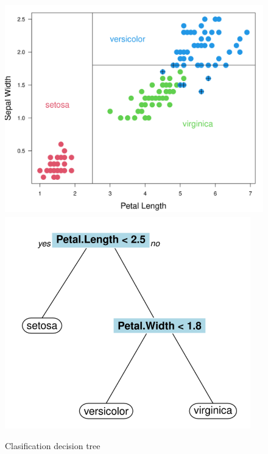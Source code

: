 \documentclass[
]{book}
\begin{document}
\begin{figure}

{\centering \includegraphics[width=0.45\linewidth,height=260pt]{./imgs/tree1} \includegraphics[width=0.45\linewidth,height=260pt]{./imgs/tree2} 

}

\caption{Clasification decision tree}\label{fig:tree}
\end{figure}
\end{document}
